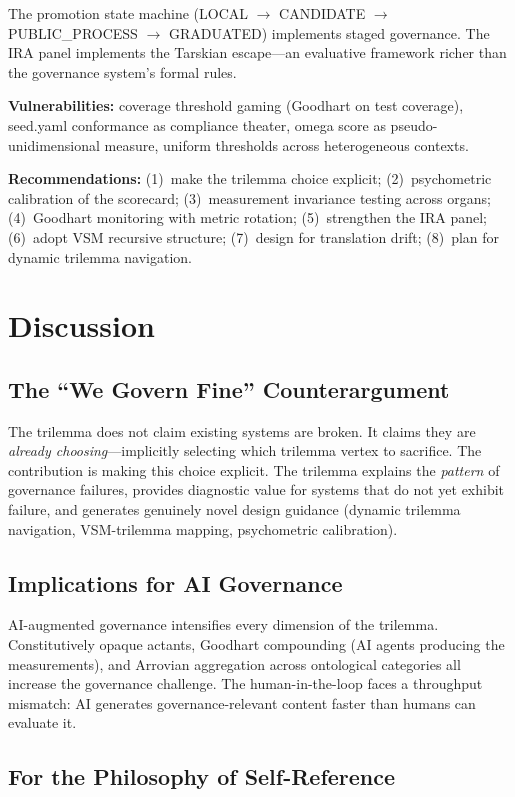 \documentclass[12pt,a4paper]{article}
\begin{document}
The promotion state machine (LOCAL $\to$ CANDIDATE $\to$ PUBLIC\_PROCESS $\to$
GRADUATED) implements staged governance. The IRA panel implements the Tarskian
escape---an evaluative framework richer than the governance system's formal
rules.

\textbf{Vulnerabilities:} coverage threshold gaming (Goodhart on test
coverage), seed.yaml conformance as compliance theater, omega score as
pseudo-unidimensional measure, uniform thresholds across heterogeneous
contexts.

\textbf{Recommendations:} (1)~make the trilemma choice explicit;
(2)~psychometric calibration of the scorecard; (3)~measurement invariance
testing across organs; (4)~Goodhart monitoring with metric rotation;
(5)~strengthen the IRA panel; (6)~adopt VSM recursive structure;
(7)~design for translation drift; (8)~plan for dynamic trilemma navigation.

\section{Discussion}

\subsection{The ``We Govern Fine'' Counterargument}

The trilemma does not claim existing systems are broken. It claims they are
\emph{already choosing}---implicitly selecting which trilemma vertex to
sacrifice. The contribution is making this choice explicit. The trilemma
explains the \emph{pattern} of governance failures, provides diagnostic value
for systems that do not yet exhibit failure, and generates genuinely novel
design guidance (dynamic trilemma navigation, VSM-trilemma mapping,
psychometric calibration).

\subsection{Implications for AI Governance}

AI-augmented governance intensifies every dimension of the trilemma.
Constitutively opaque actants, Goodhart compounding (AI agents producing the
measurements), and Arrovian aggregation across ontological categories all
increase the governance challenge. The human-in-the-loop faces a throughput
mismatch: AI generates governance-relevant content faster than humans can
evaluate it.

\subsection{For the Philosophy of Self-Reference}
\end{document}
